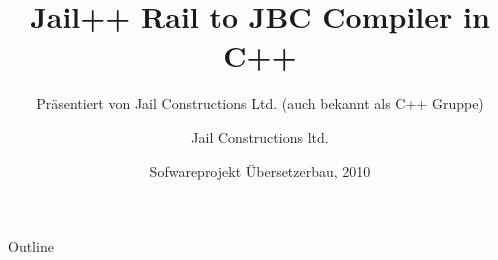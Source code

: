 \documentclass[ucs,9pt]{beamer}
\title[Jail++] %
{\textbf{Jail++} \newline Rail to JBC Compiler in C++}
\subtitle
{Pr\"asentiert von Jail Constructions Ltd. (auch bekannt als C++ Gruppe)}
\author[Jail Constructions ltd.] %
{Jail Constructions ltd.}
\institute[FU Berlin] %
{Freie Universität Berlin}
\date[CFP 2003] %
{Sofwareprojekt \"Ubersetzerbau, 2010}
\begin{document}
\begin{frame}[plain]
  \titlepage
\end{frame}

\begin{frame}{Outline}
  \tableofcontents
\end{frame}






\end{document}

